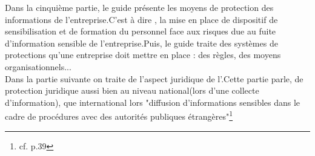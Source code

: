 Dans la cinquième partie, le guide présente les moyens de protection des informations de l'entreprise.C'est à dire , la mise en place de dispositif de sensibilisation et de formation du personnel face aux risques due au fuite d'information sensible de l'entreprise.Puis, le guide traite des systèmes de protections qu'une entreprise doit mettre en place : des règles, des moyens organisationnels... \\

 Dans la partie suivante on traite de l'aspect juridique de l'\ie .Cette partie parle, de protection juridique aussi bien au niveau national(lors d'une collecte d'information), que international lors "diffusion d'informations sensibles dans le cadre de procédures avec des autorités publiques étrangères"\footnote{cf. p.39}



